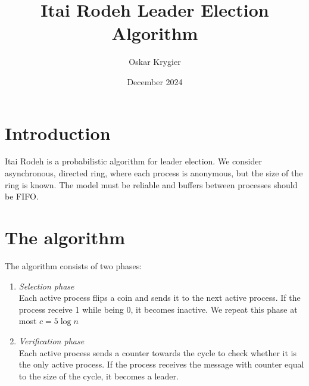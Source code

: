\documentclass{article}
\title{Itai Rodeh Leader Election Algorithm}
\author{Oskar Krygier}
\date{December 2024}
\begin{document}
\maketitle

\section{Introduction}
Itai Rodeh is a probabilistic algorithm for leader election.
We consider asynchronous, directed ring, where each process is anonymous, but the size of the ring is known. The model must be reliable and buffers between processes should be FIFO.


\section{The algorithm}
    The algorithm consists of two phases:
    \begin{enumerate}
        \item {\textit{Selection phase} \\Each active process flips a coin and sends it to the next active process. If the process receive 1 while being 0, it becomes inactive. We repeat this phase at most $c=5\log n$ }
        \item{\textit{Verification phase} \\Each active process sends a counter towards the cycle to check whether it is the only active process. If the process receives the message with counter equal to the size of the cycle, it becomes a leader.}
    \end{enumerate}
\end{document}
